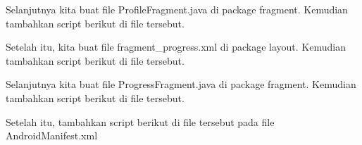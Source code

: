 Selanjutnya kita buat file ProfileFragment.java di package fragment. Kemudian tambahkan script berikut di file tersebut.


Setelah itu, kita buat file fragment\_progress.xml di package layout. Kemudian tambahkan script berikut di file tersebut.


Selanjutnya kita buat file ProgressFragment.java di package fragment. Kemudian tambahkan script berikut di file tersebut.


Setelah itu,  tambahkan script berikut di file tersebut pada file AndroidManifest.xml

